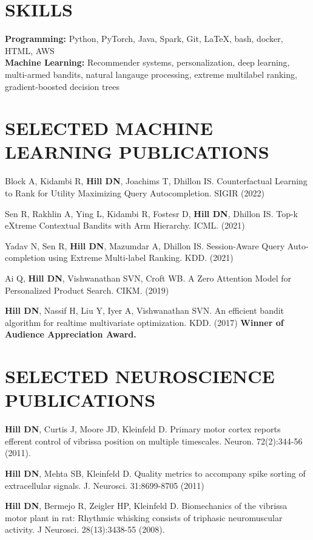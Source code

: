 \documentclass[line,10pt]{res}
\begin{document}
\begin{resume}
\section{SKILLS} 
\vspace{5pt}

{\bf Programming:} Python, PyTorch, Java, Spark, Git, \LaTeX, bash, docker, HTML, AWS \\
{\bf Machine Learning: } Recommender systems, personalization, deep learning, multi-armed bandits, natural langauge processing, extreme multilabel ranking, gradient-boosted decision trees
    
\section{SELECTED MACHINE LEARNING PUBLICATIONS} 
\vspace{5pt}

Block A, Kidambi R, \textbf{Hill DN}, Joachims T, Dhillon IS. Counterfactual Learning to Rank for Utility Maximizing Query Autocompletion. SIGIR (2022)

Sen R, Rakhlin A, Ying L, Kidambi R, Fostesr D, \textbf{Hill DN}, Dhillon IS. Top-k eXtreme Contextual Bandits with Arm Hierarchy.  ICML. (2021)

Yadav N, Sen R, \textbf{Hill DN}, Mazumdar A, Dhillon IS. Session-Aware Query Auto-completion using Extreme Multi-label Ranking.  KDD. (2021)

Ai Q, \textbf{Hill DN}, Vishwanathan SVN, Croft WB. A Zero Attention Model for Personalized Product Search. CIKM. (2019)

\textbf{Hill DN}, Nassif H, Liu Y, Iyer A, Vishwanathan SVN. An efficient bandit algorithm for realtime multivariate optimization. KDD. (2017) \textbf{Winner of Audience Appreciation Award.}


\section{SELECTED NEUROSCIENCE PUBLICATIONS} 
\vspace{5pt}

\textbf{Hill DN}, Curtis J, Moore JD, Kleinfeld D.  Primary motor cortex reports efferent control of vibrissa position on multiple timescales. Neuron. 72(2):344-56 (2011).

\textbf{Hill DN}, Mehta SB, Kleinfeld D.  Quality metrics to accompany spike sorting of extracellular signals. J. Neurosci. 31:8699-8705 (2011)

\textbf{Hill DN}, Bermejo R, Zeigler HP, Kleinfeld D. Biomechanics of the vibrissa motor plant in rat: Rhythmic whisking consists of triphasic neuromuscular activity. J Neurosci. 28(13):3438-55 (2008). 



\end{resume}
\end{document}
